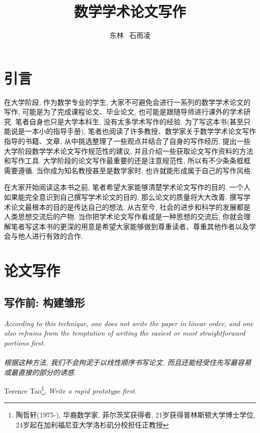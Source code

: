 \documentclass{formatBook}
\begin{document}
\title{数学学术论文写作}
\author{东林 \ 石雨凌}
\maketitle
\tableofcontents

\newpage
\chapter{引言}
在大学阶段, 作为数学专业的学生, 大家不可避免会进行一系列的数学学术论文的写作, 可能是为了完成课程论文、毕业论文, 也可能是跟随导师进行课外的学术研究. 笔者自身也只是大学本科生, 没有太多学术写作的经验. 为了写这本书(甚至只能说是一本小的指导手册), 笔者也阅读了许多教授、数学家关于数学学术论文写作指导的书籍、文章, 从中挑选整理了一些观点并结合了自身的写作经历, 提出一些大学阶段数学学术论文写作规范性的建议, 并且介绍一些获取论文写作资料的方法和写作工具. 大学阶段的论文写作最重要的还是注意规范性, 所以有不少条条框框需要遵循. 当你成为知名教授甚至是数学家时, 也许就能形成属于自己的写作风格. 

\par 在大家开始阅读这本书之前, 笔者希望大家能够清楚学术论文写作的目的. 一个人如果能完全意识到自己撰写学术论文的目的, 那么论文的质量将大大改善. 撰写学术论文最根本的目的是传达自己的想法. 从古至今, 社会的进步和科学的发展都是人类思想交流后的产物. 当你把学术论文写作看成是一种思想的交流后, 你就会理解笔者写这本书的更深的用意是希望大家能够做到尊重读者、尊重其他作者以及学会与他人进行有效的合作. 

\chapter{论文写作}
\section{写作前: 构建雏形}
\noindent \textit{According to this technique, one does not write the paper in linear order, and one also refrains from the temptation of writing the easiest or most straightforward portions first. \\ \ \\ 根据这种方法, 我们不会拘泥于以线性顺序书写论文, 而且还能经受住先写最容易或最直接的部分的诱惑. }
\begin{flushright}
    \cndash Terence Tao\footnote{陶哲轩(1975-), 华裔数学家, 菲尔茨奖获得者, 21岁获得普林斯顿大学博士学位,  24岁起在加利福尼亚大学洛杉矶分校担任正教授}, \textit{Write a rapid prototype first\cite{tao_write_2007}.}
\end{flushright}
\end{document}
